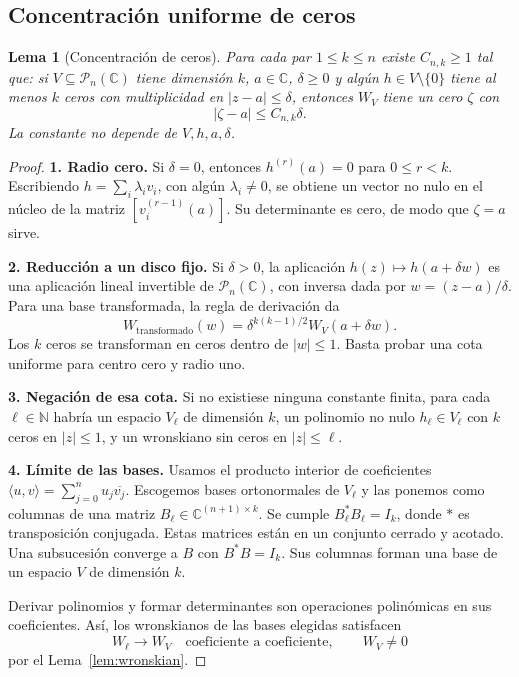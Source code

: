 \documentclass[11pt,a4paper]{article}
\numberwithin{equation}{section}
\newtheorem{lemma}[theorem]{Lema}
\theoremstyle{definition}
\theoremstyle{remark}
\newcommand{\C}{\mathbb C}
\newcommand{\N}{\mathbb N}
\newcommand{\PP}{\mathcal P}
\newcommand{\paso}[1]{\par\smallskip\noindent\textbf{#1}\quad}
\begin{document}
\subsection{Concentración uniforme de ceros}
\begin{lemma}[Concentración de ceros]\label{lem:concentration}
Para cada par $1\le k\le n$ existe $C_{n,k}\ge1$ tal que: si $V\subseteq\PP_n(\C)$ tiene dimensión $k$, $a\in\C$, $\delta\ge0$ y algún $h\in V\setminus\{0\}$ tiene al menos $k$ ceros con multiplicidad en $|z-a|\le\delta$, entonces $W_V$ tiene un cero $\zeta$ con
\begin{equation}\label{eq:concentration}
|\zeta-a|\le C_{n,k}\delta.
\end{equation}
La constante no depende de $V,h,a,\delta$.
\end{lemma}
\begin{proof}
\paso{1. Radio cero.}
Si $\delta=0$, entonces $h^{(r)}(a)=0$ para $0\le r<k$. Escribiendo $h=\sum_i\lambda_iv_i$, con algún $\lambda_i\ne0$, se obtiene un vector no nulo en el núcleo de la matriz $[v_i^{(r-1)}(a)]$. Su determinante es cero, de modo que $\zeta=a$ sirve.

\paso{2. Reducción a un disco fijo.}
Si $\delta>0$, la aplicación $h(z)\mapsto h(a+\delta w)$ es una aplicación lineal invertible de $\PP_n(\C)$, con inversa dada por $w=(z-a)/\delta$. Para una base transformada, la regla de derivación da
\[
W_{\mathrm{transformado}}(w)=\delta^{k(k-1)/2}W_V(a+\delta w).
\]
Los $k$ ceros se transforman en ceros dentro de $|w|\le1$. Basta probar una cota uniforme para centro cero y radio uno.

\paso{3. Negación de esa cota.}
Si no existiese ninguna constante finita, para cada $\ell\in\N$ habría un espacio $V_\ell$ de dimensión $k$, un polinomio no nulo $h_\ell\in V_\ell$ con $k$ ceros en $|z|\le1$, y un wronskiano sin ceros en $|z|\le\ell$.

\paso{4. Límite de las bases.}
Usamos el producto interior de coeficientes $\langle u,v\rangle=\sum_{j=0}^n u_j\overline{v_j}$. Escogemos bases ortonormales de $V_\ell$ y las ponemos como columnas de una matriz $B_\ell\in\C^{(n+1)\times k}$. Se cumple $B_\ell^*B_\ell=I_k$, donde $*$ es transposición conjugada. Estas matrices están en un conjunto cerrado y acotado. Una subsucesión converge a $B$ con $B^*B=I_k$. Sus columnas forman una base de un espacio $V$ de dimensión $k$.

Derivar polinomios y formar determinantes son operaciones polinómicas en sus coeficientes. Así, los wronskianos de las bases elegidas satisfacen
\[
W_\ell\longrightarrow W_V\quad\text{coeficiente a coeficiente},\qquad W_V\ne0
\]
por el Lema~\ref{lem:wronskian}.


\end{proof}
\end{document}
